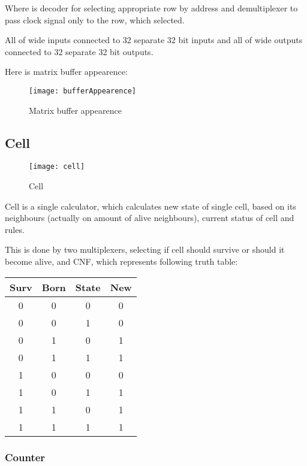 Where is decoder for selecting appropriate row by address and demultiplexer to pass clock signal only to the row, which selected.

All of wide inputs connected to 32 separate 32 bit inputs and all of wide outputs connected to 32 separate 32 bit outputs.

\clearpage
Here is matrix buffer appearence:

\begin{figure}[ht]
	\centering
	\texttt{[image: bufferAppearence]}
	\caption{Matrix buffer appearence}
\end{figure}

\subsection*{Cell}

\begin{figure}[!htb]
	\centering
	\texttt{[image: cell]}
	\caption{Cell}
\end{figure}

Cell is a single calculator, which calculates new state of single cell, based on its neighbours (actually on amount of alive neighbours), current status of cell and rules.

This is done by two multiplexers, selecting if cell should survive or should it become alive, and CNF, which represents following truth table:

\begin{center}
	\begin{tabular}{|c|c|c|c|}
		\hline
		Surv & Born & State & New \\
		\hline
		0 & 0 & 0 & 0  \\
		\hline
		0 & 0 & 1 & 0 \\
		\hline
		0 & 1 & 0 & 1 \\
		\hline
		0 & 1 & 1 & 1 \\
		\hline
		1 & 0 & 0 & 0 \\
		\hline
		1 & 0 & 1 & 1 \\
		\hline
		1 & 1 & 0 & 1 \\
		\hline
		1 & 1 & 1 & 1 \\
		\hline
	\end{tabular}
\end{center}

\subsubsection*{Counter}

